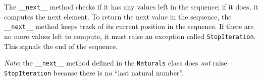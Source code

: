 The \lstinline$__next__$ method checks if it has any values left in the
sequence; if it does, it computes the next element.  To return the next value in
the sequence, the \lstinline$__next__$ method keeps track of its current
position in the sequence. If there are no more values left to compute, it must
raise an exception called \lstinline$StopIteration$. This signals the end of the
sequence.

\emph{Note}: the \lstinline$__next__$ method defined in the \lstinline$Naturals$
class does \emph{not} raise \lstinline$StopIteration$ because there is no ``last
natural number''.


